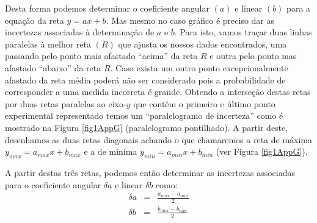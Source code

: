 \documentclass[12pt]{article}
\newcommand{\bse}{\begin{subequations}}
\newcommand{\ese}{\end{subequations}}
\newcommand{\bea}{\begin{eqnarray}}
\newcommand{\eea}{\end{eqnarray}}
\begin{document}
Desta forma podemos determinar o coeficiente angular $(a)$ e linear $(b)$ para a equação da reta 
$y=ax+b$. Mas mesmo no caso gráfico é preciso dar as incertezas associadas à determinação de 
$a$ e $b$. Para isto, vamos traçar duas linhas paralelas à melhor reta $(R)$ que ajusta os nossos dados encontrados, uma passando pelo ponto mais afastado ``acima'' da reta $R$ e outra pelo ponto mas afastado ``abaixo'' da reta $R$. Caso exista um outro ponto excepcionalmente afastado da reta média poderá não ser considerado pois a probabilidade de corresponder a uma medida incorreta é grande. Obtendo a interseção destas
retas por duas retas paralelas ao eixo-$y$ que contêm o primeiro e último ponto experimental representado temos um ``paralelogramo de incerteza'' como é mostrado na Figura
\ref{fig1AppG} (paralelogramo pontilhado). A partir deste, desenhamos as duas retas diagonais achando o que chamaremos a reta de máxima $y_{max}=a_{max}x+b_{max}$ e a de mínima 
$y_{min}=a_{min}x+b_{min}$ (ver Figura \ref{fig1AppG}).
\par
A partir destas três retas, podemos então determinar as incertezas associadas para o 
coeficiente angular $\delta a$ e linear $\delta b$ como:
\bse
\bea
\delta a&=&\frac{a_{max}-a_{min}}{2}\\
\delta b&=&\frac{b_{max}-b_{min}}{2}
\eea
\ese
\end{document}
